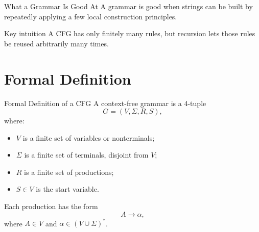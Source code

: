 \documentclass[aspectratio=169,10pt]{beamer}
\begin{document}
\begin{frame}{What a Grammar Is Good At}
\small
A grammar is good when strings can be built by repeatedly applying a few local construction principles.

\begin{center}
\end{center}

\vspace{0.5em}
\begin{alertblock}{Key intuition}
A CFG has only finitely many rules, but recursion lets those rules be reused arbitrarily many times.
\end{alertblock}
\end{frame}

\section{Formal Definition}

\begin{frame}{Formal Definition of a CFG}
A context-free grammar is a 4-tuple
\[
G=(V,\Sigma,R,S),
\]
where:

\begin{itemize}
    \item \(V\) is a finite set of \alert{variables} or \alert{nonterminals};
    \item \(\Sigma\) is a finite set of \alert{terminals}, disjoint from \(V\);
    \item \(R\) is a finite set of productions;
    \item \(S\in V\) is the start variable.
\end{itemize}

\vspace{0.5em}
Each production has the form
\[
A\to \alpha,
\]
where \(A\in V\) and \(\alpha\in (V\cup\Sigma)^*\).
\end{frame}
\end{document}
